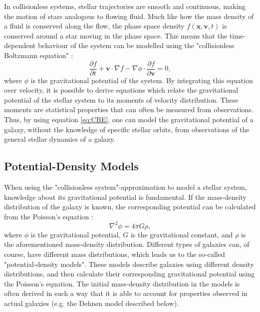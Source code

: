 \documentclass[english, oneside]{HYgradu}
\begin{document}
In collisionless systems, stellar trajectories are smooth and continuous, making the motion of stars analogous to flowing fluid. Much like how the mass density of a fluid is conserved along the flow, the phase space density $f(\mathbf{x}, \mathbf{v}, t)$ is conserved around a star moving in the phase space. This means that the time-dependent behaviour of the system can be modelled using the "collisionless Boltzmann equation" \citep{MerrittBook}:
\begin{equation}
\frac{\partial f}{\partial t} + \mathbf{v} \cdot \nabla f - \nabla \phi \cdot \frac{\partial f}{\partial \mathbf{v}} = 0, \label{eq:CBE}
\end{equation}
where $\phi$ is the gravitational potential of the system. By integrating this equation over velocity, it is possible to derive equations which relate the gravitational potential of the stellar system to its moments of velocity distribution. These moments are statistical properties that can often be measured from observations. Thus, by using equation \ref{eq:CBE}, one can model the gravitational potential of a galaxy, without the knowledge of specific stellar orbits, from observations of the general stellar dynamics of a galaxy.
  
\subsection{Potential-Density Models}

When using the "collisionless system"-approximation to model a stellar system, knowledge about its gravitational potential is fundamental. If the mass-density distribution of the galaxy is known, the corresponding potential can be calculated from the Poisson's equation \citep{BinneyTremaine}:
\begin{equation}
\nabla^2 \phi = 4 \pi G \rho, \label{eq:poisson}
\end{equation}
where $\phi$ is the gravitational potential, $G$ is the gravitational constant, and $\rho$ is the aforementioned mass-density distribution. Different types of galaxies can, of course, have different mass distributions, which leads us to the so-called "potential-density models". These models describe galaxies using different density distributions, and then calculate their corresponding gravitational potential using the Poisson's equation. The initial mass-density distribution in the models is often derived in such a way that it is able to account for properties observed in actual galaxies (e.g. the Dehnen model described below). 
\end{document}
